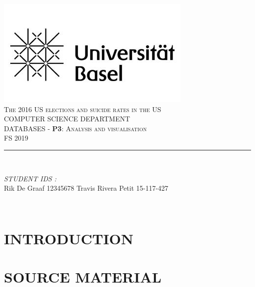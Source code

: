 \documentclass[12pt]{article}
\begin{document}
\begin{titlepage}
	\centering
    \vspace*{0.5 cm}
    \includegraphics[scale = 0.5]{unibas_logo.jpeg}\\[1.0 cm]
    \textsc{\LARGE  The 2016 US elections and suicide rates in the US}\\[2.0 cm]
    \textsc{ COMPUTER SCIENCE DEPARTMENT}\\[0.2 cm]
	\textsc{DATABASES - \textbf{P3}: Analysis and visualisation}\\[0.2cm]
	\textsc{\Large FS 2019}\\[0.5 cm]
	\rule{\linewidth}{0.2 mm} \\[0.4 cm]

	\begin{minipage}{0.4\textwidth}

			\begin{flushright}
			\emph{STUDENT IDS :} \\
				Rik De Graaf {\color{red}12345678}\linebreak
			Travis Rivera Petit 15-117-427\linebreak
		\end{flushright}
	\end{minipage}\\[2 cm]


	\vfill

\end{titlepage}



\section{INTRODUCTION}

%

\section{SOURCE MATERIAL}

%
\end{document}
